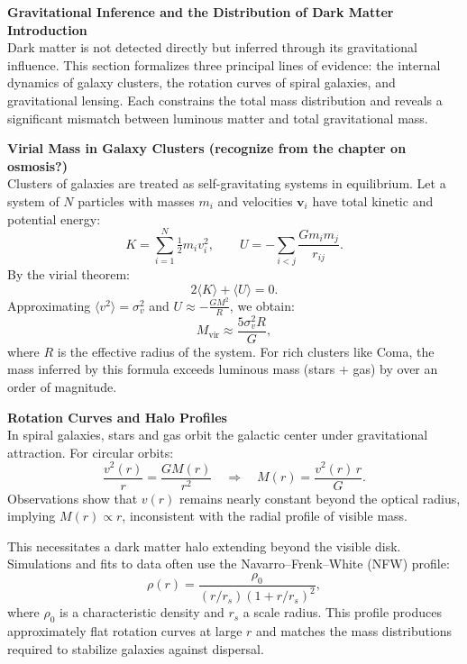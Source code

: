 \begin{technical}
{\Large\textbf{Gravitational Inference and the Distribution of Dark Matter}}\\[0.2em]

\noindent\textbf{Introduction}\\[0.25em]
Dark matter is not detected directly but inferred through its gravitational influence. This section formalizes three principal lines of evidence: the internal dynamics of galaxy clusters, the rotation curves of spiral galaxies, and gravitational lensing. Each constrains the total mass distribution and reveals a significant mismatch between luminous matter and total gravitational mass.

\noindent\textbf{Virial Mass in Galaxy Clusters (recognize from the chapter on osmosis?)}\\[0.25em]
Clusters of galaxies are treated as self-gravitating systems in equilibrium. Let a system of \( N \) particles with masses \( m_i \) and velocities \( \mathbf{v}_i \) have total kinetic and potential energy:
\[
K = \sum_{i=1}^N \tfrac{1}{2} m_i v_i^2, \qquad
U = - \sum_{i<j} \frac{G m_i m_j}{r_{ij}}.
\]
By the virial theorem:
\[
2\langle K \rangle + \langle U \rangle = 0.
\]
Approximating \( \langle v^2 \rangle = \sigma_v^2 \) and \( U \approx - \tfrac{G M^2}{R} \), we obtain:
\[
M_{\text{vir}} \approx \frac{5 \sigma_v^2 R}{G},
\]
where \( R \) is the effective radius of the system. For rich clusters like Coma, the mass inferred by this formula exceeds luminous mass (stars + gas) by over an order of magnitude.

\noindent\textbf{Rotation Curves and Halo Profiles}\\[0.25em]
In spiral galaxies, stars and gas orbit the galactic center under gravitational attraction. For circular orbits:
\[
\frac{v^2(r)}{r} = \frac{G M(r)}{r^2} \quad \Rightarrow \quad M(r) = \frac{v^2(r)\,r}{G}.
\]
Observations show that \( v(r) \) remains nearly constant beyond the optical radius, implying \( M(r) \propto r \), inconsistent with the radial profile of visible mass.

This necessitates a dark matter halo extending beyond the visible disk. Simulations and fits to data often use the Navarro–Frenk–White (NFW) profile:
\[
\rho(r) = \frac{\rho_0}{(r/r_s)(1 + r/r_s)^2},
\]
where \( \rho_0 \) is a characteristic density and \( r_s \) a scale radius. This profile produces approximately flat rotation curves at large \( r \) and matches the mass distributions required to stabilize galaxies against dispersal.


\end{technical}
